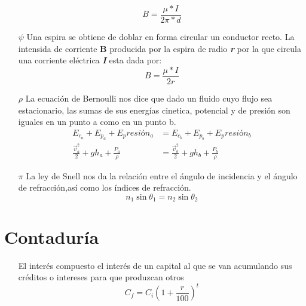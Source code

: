 \documentclass[letterpaper,global 12pt]{article}
\begin{document}
\begin{itemize}
    \begin{equation*}
        B=\frac{\mu *I}{2\pi *d}
    \end{equation*}
    \item[$\psi$]Una espira se obtiene de doblar en forma circular un conductor recto. La intensida de corriente \textbf{B} producida por la espira de radio \textbf{\textit{r}} por la que circula una corriente eléctrica \textbf{\textit{I}} esta dada por:
    \begin{equation*}
        B=\frac{\mu *I}{2r}
    \end{equation*}
    \item[$\rho$]La ecuación de Bernoulli nos dice que dado un fluido cuyo flujo sea estacionario, las sumas de sus energías cinetica, potencial y de presión son iguales en un punto a como en un punto b. 
    \begin{align*}
        E_c_a+E_p_a+E_presión_a&=E_c_b+E_p_b+E_presión_b\\
        \frac{\Vec{v}_a^2}{2}+gh_a+\frac{P_a}{\rho}&=\frac{\Vec{v}_b^2}{2}+gh_b+\frac{P_b}{\rho}
    \end{align*}
    \item[$\pi$]La ley de Snell nos da la relación entre el ángulo de incidencia y el ángulo de refracción,así como los índices de refracción.
    \begin{equation*}
        n_1\sin\theta _1=n_2\sin\theta _2
    \end{equation*}
\end{itemize}
\section{Contaduría}
\begin{itemize}\color{magenta}
    \item [\wp]El interés compuesto el interés de un capital al que se van acumulando sus créditos o intereses para que produzcan otros
  \begin{equation*}
        C_f=C_i(1+\frac{r}{100})^t
    \end{equation*}\color{black}
\end{itemize}
\end{document}
